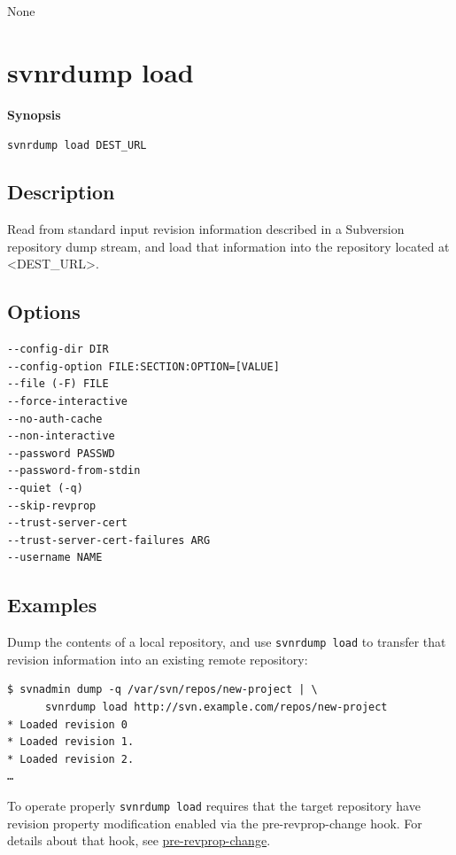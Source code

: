 None

\section{svnrdump load}\label{svn.ref.svnrdump.c.load}

\emph{}

\textbf{Synopsis}

\texttt{svnrdump\ load\ DEST\_URL}

\subsection{Description}

Read from standard input revision information described in a Subversion
repository dump stream, and load that information into the repository
located at \textless DEST\_URL\textgreater.

\subsection{Options}

\begin{verbatim}
--config-dir DIR
--config-option FILE:SECTION:OPTION=[VALUE]
--file (-F) FILE
--force-interactive
--no-auth-cache
--non-interactive
--password PASSWD
--password-from-stdin
--quiet (-q)
--skip-revprop
--trust-server-cert
--trust-server-cert-failures ARG
--username NAME
\end{verbatim}

\subsection{Examples}

Dump the contents of a local repository, and use \texttt{svnrdump\ load}
to transfer that revision information into an existing remote
repository:

\begin{verbatim}
$ svnadmin dump -q /var/svn/repos/new-project | \
      svnrdump load http://svn.example.com/repos/new-project
* Loaded revision 0
* Loaded revision 1.
* Loaded revision 2.
…
\end{verbatim}

To operate properly \texttt{svnrdump\ load} requires that the target
repository have revision property modification enabled via the
pre-revprop-change hook. For details about that hook, see
\hyperref[svn.ref.reposhooks.pre-revprop-change]{pre-revprop-change}.

